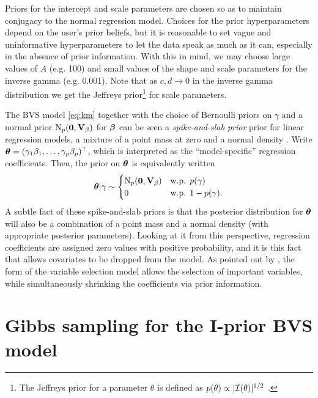\documentclass[11pt,twoside,openright]{report}
\begin{document}
Priors for the intercept and scale parameters are chosen so as to maintain conjugacy to the normal regression model. 
Choices for the prior hyperparameters depend on the user's prior beliefs, but it is reasonable to set vague and uninformative hyperparameters to let the data speak as much as it can, especially in the absence of prior information. 
With this in mind, we may choose large values of $A$ (e.g. 100) and small values of the shape and scale parameters for the inverse gamma (e.g. 0.001). 
Note that as $c,d \to 0$ in the inverse gamma distribution we get the Jeffreys prior\footnote{The Jeffreys prior for a parameter $\theta$ is defined as $p(\theta) \propto \vert {\mathcal I}(\theta) \vert^{1/2}$ \citep{jeffreys1946invariant}.} for scale parameters.

\begin{remark}
  The BVS model \cref{eq:km} together with the choice of Bernoulli priors on $\gamma$ and a normal prior $\operatorname{N}_p({\mathbf 0},{\mathbf V}_\beta)$ for ${\bm\beta}$ can be seen a \emph{spike-and-slab prior} prior for linear regression models, a mixture of a point mass at zero and a normal density \citep{mitchell1988bayesian,geweke1996variable}.
  Write ${\bm\theta} = (\gamma_1\beta_1,\dots,\gamma_p\beta_p)^\top$, which is interpreted as the ``model-specific'' regression coefficients.
  Then, the prior on ${\bm\theta}$ is equivalently written
  \[
    {\bm\theta}|\gamma \sim
    \begin{cases}
      \operatorname{N}_p({\mathbf 0},{\mathbf V}_\beta) & \text{w.p. } p(\gamma) \\
      0 & \text{w.p. } 1 - p(\gamma).
    \end{cases}
  \]
  A subtle fact of these spike-and-slab priors is that the posterior distribution for ${\bm\theta}$ will also be a combination of a point mass and a normal density (with appropriate posterior parameters).
  Looking at it from this perspective, regression coefficients are assigned zero values with positive probability, and it is this fact that allows covariates to be dropped from the model.
  As pointed out by \citet{Kuo1998}, the form of the variable selection model allows the selection of important variables, while simultaneously shrinking the coefficients via prior information.
\end{remark}

\section{Gibbs sampling for the I-prior BVS model}
\end{document}
